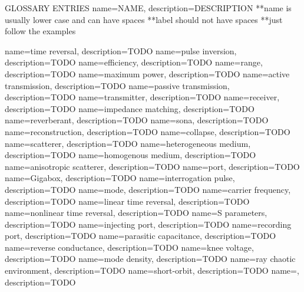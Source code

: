 \printglossary
\clearpage

GLOSSARY ENTRIES
{
  name=NAME,
  description={DESCRIPTION}
}
**name is usually lower case and can have spaces
**label should not have spaces
**just follow the examples

{
    name=time reversal,
    description={TODO}
}
{
   name=pulse inversion,
  description={TODO}
}
{
   name=efficiency,
  description={TODO}
}
{
   name=range,
  description={TODO}
}
{
   name=maximum power,
  description={TODO}
}
{
   name=active transmission,
  description={TODO}
}
{
   name=passive transmission,
  description={TODO}
}
{
   name=transmitter,
  description={TODO}
}
{
   name=receiver,
  description={TODO}
}
{
   name=impedance matching,
  description={TODO}
}
{
   name=reverberant,
  description={TODO}
}
{
   name=sona,
  description={TODO}
}
{
   name=reconstruction,
  description={TODO}
}
{
   name=collapse,
  description={TODO}
}
{
   name=scatterer,
  description={TODO}
}
{
   name=heterogeneous medium,
  description={TODO}
}
{
   name=homogenous medium,
  description={TODO}
}
{
   name=anisotropic scatterer,
  description={TODO}
}
{
   name=port,
  description={TODO}
}
{
   name=Gigabox,
  description={TODO}
}
{
   name=interrogation pulse,
  description={TODO}
}
{
   name=mode,
  description={TODO}
}
{
   name=carrier frequency,
  description={TODO}
}
{
   name=linear time reversal,
  description={TODO}
}
{
   name=nonlinear time reversal,
  description={TODO}
}
{
   name=S parameters,
  description={TODO}
}
{
   name=injecting port,
  description={TODO}
}
{
   name=recording port,
  description={TODO}
}
{
   name=parasitic capacitance,
  description={TODO}
}
{
   name=reverse conductance,
  description={TODO}
}
{
   name=knee voltage,
  description={TODO}
}
{
   name=mode density,
  description={TODO}
}
{
   name=ray chaotic environment,
  description={TODO}
}
{
   name=short-orbit,
  description={TODO}
}
\newglossaryentry{}
{
   name=,
  description={TODO}
}








